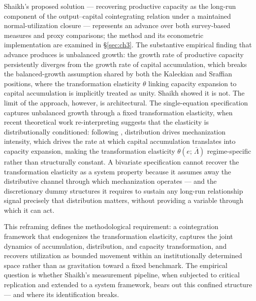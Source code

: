 \documentclass[11pt,a4paper]{article}
\begin{document}

Shaikh's proposed solution --- recovering productive capacity as the
long-run component of the output--capital cointegrating relation under a
maintained normal-utilization closure --- represents an advance over both
survey-based measures and proxy comparisons; the method and its econometric
implementation are examined in \S\ref{sec:ch3}. The substantive empirical
finding that advance produces is unbalanced growth: the growth rate of
productive capacity persistently diverges from the growth rate of capital
accumulation, which breaks the balanced-growth assumption shared by both the
Kaleckian and Sraffian positions, where the transformation elasticity
$\theta$ linking capacity expansion to capital accumulation is implicitly
treated as unity. Shaikh showed it is not. The limit of the approach,
however, is architectural. The single-equation specification captures
unbalanced growth through a fixed transformation elasticity, when recent
theoretical work re-interpreting \citet{Kaldor1957} suggests that the
elasticity is distributionally conditioned: following \citet{Cajas2024},
distribution drives mechanization intensity, which drives the rate at which
capital accumulation translates into capacity expansion, making the
transformation elasticity $\theta(e;\,\bar{\Lambda})$ regime-specific rather
than structurally constant. A bivariate specification cannot recover the
transformation elasticity as a system property because it assumes away the
distributive channel through which mechanization operates --- and the
discretionary dummy structures it requires to sustain any long-run
relationship signal precisely that distribution matters, without providing a
variable through which it can act.


This reframing defines the methodological requirement: a cointegration
framework that endogenizes the transformation elasticity, captures the joint
dynamics of accumulation, distribution, and capacity transformation, and
recovers utilization as bounded movement within an institutionally determined
space rather than as gravitation toward a fixed benchmark. The empirical
question is whether Shaikh's measurement pipeline, when subjected to critical
replication and extended to a system framework, bears out this confined
structure --- and where its identification breaks.
\end{document}
